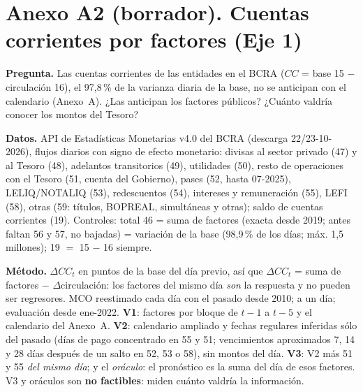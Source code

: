 \documentclass[11pt,a4paper]{article}
\begin{document}
\section*{Anexo A2 (borrador). Cuentas corrientes por factores (Eje 1)}

\textbf{Pregunta.} Las cuentas corrientes de las entidades en el BCRA ($CC$ = base 15 $-$ circulación 16), el 97,8\,\% de la varianza diaria de la base, no se anticipan con el calendario (Anexo~A). ¿Las anticipan los factores públicos? ¿Cuánto valdría conocer los montos del Tesoro?

\textbf{Datos.} API de Estadísticas Monetarias v4.0 del BCRA (descarga 22/23-10-2026), flujos diarios con signo de efecto monetario: divisas al sector privado (47) y al Tesoro (48), adelantos transitorios (49), utilidades (50), resto de operaciones con el Tesoro (51, cuenta del Gobierno), pases (52, hasta 07-2025), LELIQ/NOTALIQ (53), redescuentos (54), intereses y remuneración (55), LEFI (58), otras (59: títulos, BOPREAL, simultáneas y otras); saldo de cuentas corrientes (19). Controles: total 46 = suma de factores (exacta desde 2019; antes faltan 56 y 57, no bajadas) = variación de la base (98,9\,\% de los días; máx. 1,5 millones); 19 $=$ 15 $-$ 16 siempre.

\textbf{Método.} $\Delta CC_t$ en puntos de la base del día previo, así que $\Delta CC_t$ = suma de factores $-$ $\Delta$circulación: los factores del mismo día \emph{son} la respuesta y no pueden ser regresores. MCO reestimado cada día con el pasado desde 2010; a un día; evaluación desde ene-2022. \textbf{V1}: factores por bloque de $t-1$ a $t-5$ y el calendario del Anexo~A. \textbf{V2}: calendario ampliado y fechas regulares inferidas sólo del pasado (días de pago concentrado en 55 y 51; vencimientos aproximados 7, 14 y 28 días después de un salto en 52, 53 o 58), sin montos del día. \textbf{V3}: V2 más 51 y 55 \emph{del mismo día}; y el \emph{oráculo}: el pronóstico es la suma del día de esos factores. V3 y oráculos son \textbf{no factibles}: miden cuánto valdría la información.
\end{document}
